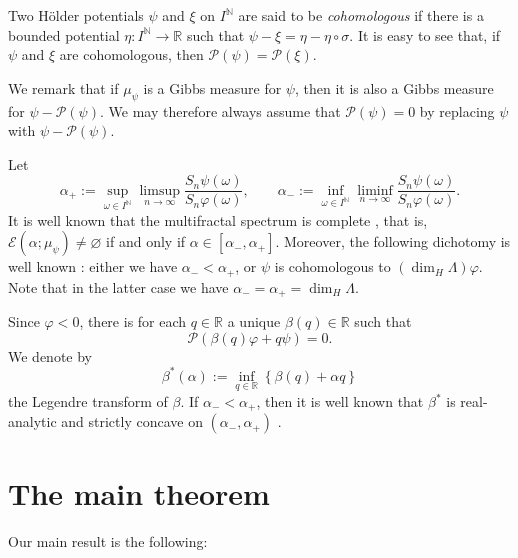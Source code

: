 \documentclass[11pt]{amsart}
\newcommand\NN{\mathbb{N}}
\newcommand\RR{\mathbb{R}}
\newcommand\EE{\mathscr{E}}
\newcommand\pressure{\mathcal{P}}
\newcommand{\1}{1}
\newcommand{\N}{\mathbb{N}}
\newcommand{\R}{\mathbb{R}}
\renewcommand{\emptyset}{\varnothing}
\begin{document}
Two H\"older potentials $\psi$ and $\xi$ on $I^\NN$ are said to be {\em cohomologous} if there is a bounded potential $\eta:I^\NN\to\RR$ such that $\psi-\xi=\eta-\eta\circ\sigma$. It is easy to see that, if $\psi$ and $\xi$ are cohomologous, then $\mathcal{P}(\psi)=\mathcal{P}(\xi)$.

We remark that if $\mu_\psi$ is a Gibbs measure for $\psi$, then it is also a Gibbs measure for $\psi-\pressure(\psi)$. We may therefore always assume that $\pressure(\psi)=0$ by replacing $\psi$ with $\psi-\pressure(\psi)$. 

Let 
\begin{equation} \label{spectrum-endpoints}
\alpha_{+}:=\sup_{\omega \in I^\N}\limsup_{n\rightarrow \infty } \frac{S_n \psi(\omega)}{S_n \varphi (\omega)} 
, \qquad
\alpha_{-}:=\inf_{\omega \in I^\N}\liminf_{n\rightarrow \infty } \frac{S_n \psi(\omega)}{S_n \varphi (\omega)} .
\end{equation}
It is well known that the multifractal spectrum is complete \cite{schmeling1999}, that is, $\EE(\alpha;\mu_\psi)\neq\emptyset$ if and only if $\alpha\in\left[\alpha_{-},\alpha_{+}\right]$. 
Moreover, the following dichotomy is well known \cite{Pesin-Weiss-97a}: either we have $\alpha_{-}<\alpha_{+}$, or $\psi$ is cohomologous to $(\dim_{H}\Lambda)\varphi$. Note that in the latter case we have  $\alpha_{-}=\alpha_{+}=\dim_{H}\Lambda$.

Since $\varphi<0$, there is for each $q\in\R$ a unique $\beta(q)\in\RR$ such that 
\begin{equation}
\mathcal{P}(\beta(q)\varphi+q\psi)=0. \label{eq:pressure equation}
\end{equation}
We denote by 
\begin{equation} \label{eq:Legendre-transform}
\beta^{*}(\alpha):=\inf_{q\in\R}\left\{\beta(q)+\alpha q\right\}
\end{equation}
the Legendre transform of $\beta$. 
If $\alpha_-<\alpha_+$, then it is well known that $\beta^*$ is real-analytic and strictly concave on $(\alpha_-,\alpha_+)$ \cite{pesin-dimension-theory}.



\section{The main theorem} \label{sec:main-theorem}

Our main result is the following:
\end{document}
